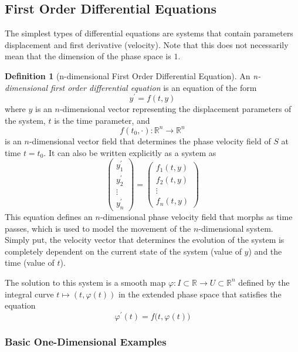 \documentclass{article}
\theoremstyle{remark}
\theoremstyle{definition}
\newtheorem{definition}{Definition}[section]
\begin{document}
  \subsection{First Order Differential Equations}

    The simplest types of differential equations are systems that contain parameters displacement and first derivative (velocity). Note that this does not necessarily mean that the dimension of the phase space is $1$. 

    \begin{definition}[n-dimensional First Order Differential Equation]
    An \textit{n-dimensional first order differential equation} is an equation of the form
    \[y^\prime = f(t, y)\]
    where $y$ is an $n$-dimensional vector representing the displacement parameters of the system, $t$ is the time parameter, and
    \[f(t_0, \cdot) : \mathbb{R}^n \longrightarrow \mathbb{R}^n\]
    is an $n$-dimensional vector field that determines the phase velocity field of $S$ at time $t = t_0$. It can also be written explicitly as a system as 
    \[\begin{pmatrix}
    y_1^\prime \\ y_2^\prime \\ \vdots \\ y_n^\prime
    \end{pmatrix} = \begin{pmatrix}
    f_1 (t, y) \\ f_2 (t, y) \\ \vdots \\ f_n (t, y)
    \end{pmatrix}\]
    This equation defines an $n$-dimensional phase velocity field that morphs as time passes, which is used to model the movement of the $n$-dimensional system. Simply put, the velocity vector that determines the evolution of the system is completely dependent on the current state of the system (value of $y$) and the time (value of $t$). 

    The solution to this system is a smooth map $\varphi: I \subset \mathbb{R} \longrightarrow U \subset \mathbb{R}^n$ defined by the integral curve $t \mapsto (t, \varphi(t))$ in the extended phase space that satisfies the equation
    \[\varphi^\prime (t) = f\big( t, \varphi(t) \big)\]
    \end{definition}

    \subsubsection{Basic One-Dimensional Examples}
\end{document}

